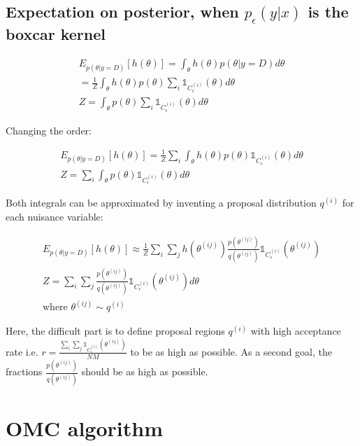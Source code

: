 \documentclass{article}
\begin{document}
\subsection*{Expectation on posterior, when $p_{\epsilon}(y|x)$ is the boxcar kernel}

\begin{gather} \label{eq:exp_post_1}
  E_{p(\theta|y=D)}[h(\theta)] = \int_\theta h(\theta)p(\theta|y=D)d\theta \\
  = \frac{1}{Z} \int_\theta h(\theta)p(\theta) \sum_i \mathbb{1}_{C_\epsilon^{(i)}}(\theta) d\theta \\
  Z = \int_\theta p(\theta) \sum_i \mathbb{1}_{C_\epsilon^{(i)}}(\theta) d\theta
\end{gather}

Changing the order:

\begin{gather} \label{eq:exp_post_2}
  E_{p(\theta|y=D)}[h(\theta)] = \frac{1}{Z} \sum_i \int_\theta h(\theta)p(\theta) \mathbb{1}_{C_\epsilon^{(i)}}(\theta) d\theta \\
  Z = \sum_i \int_\theta p(\theta) \mathbb{1}_{C_\epsilon^{(i)}}(\theta) d\theta
\end{gather}


Both integrals can be approximated by inventing a proposal distribution $q^{(i)}$ for each nuisance variable:

\begin{gather} \label{eq:exp_post_appr}
  E_{p(\theta|y=D)}[h(\theta)] \approx \frac{1}{Z} \sum_i \sum_j h(\theta^{(ij)})\frac{p(\theta^{(ij)})}{q(\theta^{(ij)})} \mathbb{1}_{C_\epsilon^{(i)}}(\theta^{(ij)}) \\
  Z = \sum_i \sum_j \frac{p(\theta^{(ij)})}{q(\theta^{(ij)})} \mathbb{1}_{C_\epsilon^{(i)}}(\theta^{(ij)}) d\theta \\
  \text{where  } \theta^{(ij)} \sim q^{(i)}
\end{gather}

  
Here, the difficult part is to define proposal regions $q^{(i)}$ with high acceptance rate i.e. $r = \frac{\sum_i \sum_j \mathbb{1}_{C_\epsilon^{(i)}}(\theta^{(ij)})}{NM}$ to be as high as possible. As a second goal, the fractions $\frac{p(\theta^{(ij)})}{q(\theta^{(ij)})}$ should be as high as possible.


\section{OMC algorithm}
\end{document}
